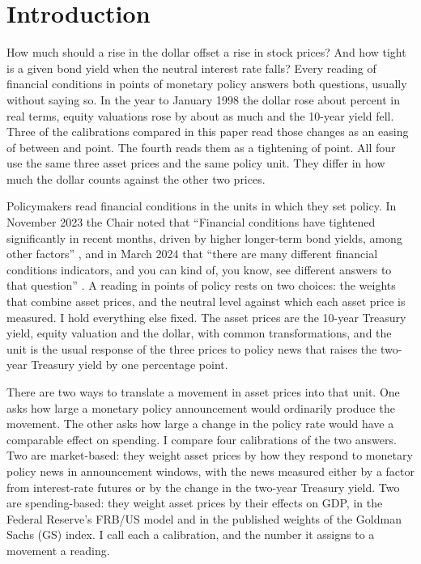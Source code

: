 \section{Introduction}
How much should a rise in the dollar offset a rise in stock prices? And how tight is a given bond yield when the neutral interest rate falls? Every reading of financial conditions in points of monetary policy answers both questions, usually without saying so. In the year to January 1998 the dollar rose about  percent in real terms, equity valuations rose by about as much and the 10-year yield fell. Three of the calibrations compared in this paper read those changes as an easing of between  and  point. The fourth reads them as a tightening of  point. All four use the same three asset prices and the same policy unit. They differ in how much the dollar counts against the other two prices.

Policymakers read financial conditions in the units in which they set policy. In November 2023 the Chair noted that ``Financial conditions have tightened significantly in recent months, driven by higher longer-term bond yields, among other factors'' \citep{powell2023}, and in March 2024 that ``there are many different financial conditions indicators, and you can kind of, you know, see different answers to that question'' \citep{powell2024}. A reading in points of policy rests on two choices: the weights that combine asset prices, and the neutral level against which each asset price is measured. I hold everything else fixed. The asset prices are the 10-year Treasury yield, equity valuation and the dollar, with common transformations, and the unit is the usual response of the three prices to policy news that raises the two-year Treasury yield by one percentage point.

There are two ways to translate a movement in asset prices into that unit. One asks how large a monetary policy announcement would ordinarily produce the movement. The other asks how large a change in the policy rate would have a comparable effect on spending. I compare four calibrations of the two answers. Two are market-based: they weight asset prices by how they respond to monetary policy news in announcement windows, with the news measured either by a factor from interest-rate futures or by the change in the two-year Treasury yield. Two are spending-based: they weight asset prices by their effects on GDP, in the Federal Reserve's FRB/US model and in the published weights of the Goldman Sachs (GS) index. I call each a calibration, and the number it assigns to a movement a reading.

